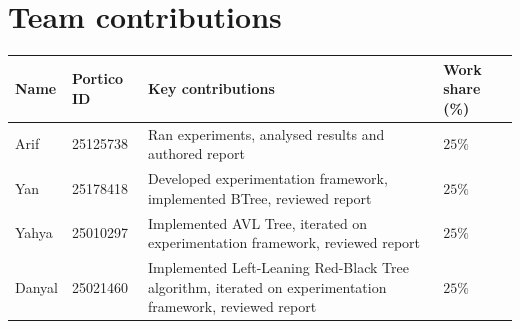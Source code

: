 \documentclass[12pt]{article}
\begin{document}
\section{Team contributions}


\vspace{1cm}

\begin{tabular}{|l|l|p{6cm}|l|}
\hline
{\bf Name} & {\bf Portico ID} & {\bf Key contributions} & {\bf Work share (\%)} \\[1mm]
\hline
Arif    &  25125738  & Ran experiments, analysed results and authored report & $25\%$ \\\hline
Yan     &25178418    &Developed experimentation framework, implemented BTree, reviewed report& $25\%$ \\\hline
Yahya   &   25010297 &  Implemented AVL Tree, iterated on experimentation framework, reviewed report   &  $25\%$   \\\hline
Danyal  &25021460    &Implemented Left-Leaning Red-Black Tree algorithm, iterated on experimentation framework, reviewed report     &$25\%$       \\
\hline
\end{tabular}



\end{document}
